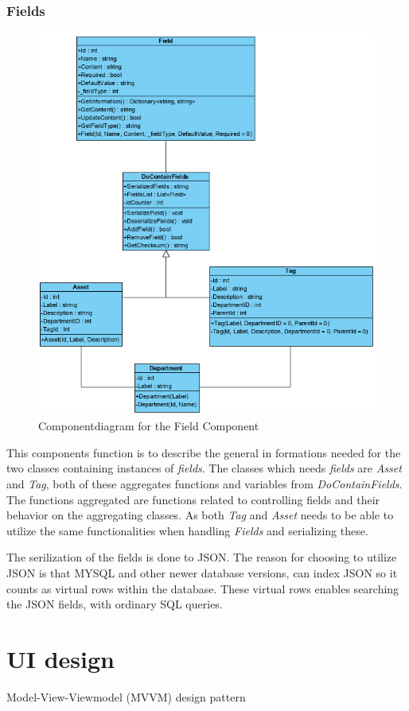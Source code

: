 \subsubsection{Fields}
\begin{figure}[H]
    \centering
    \includegraphics{figures/FieldsComponent.PNG}
    \caption{Componentdiagram for the Field Component}
    \label{fig:FieldsComponent}
\end{figure}
This components function is to describe the general in formations needed for the two classes containing instances of \textit{fields}. The classes which needs \textit{fields} are \textit{Asset} and \textit{Tag}, both of these aggregates functions and variables from \textit{DoContainFields}. The functions aggregated are functions related to controlling fields and their behavior on the aggregating classes. As both \textit{Tag} and \textit{Asset} needs to be able to utilize the same functionalities when handling \textit{Fields} and serializing these. 
\par
The serilization of the fields is done to JSON. The reason for choosing to utilize JSON is that MYSQL and other newer database versions, can index JSON so it counts as virtual rows within the database. These virtual rows enables searching the JSON fields, with ordinary SQL queries.



\section{UI design}
Model-View-Viewmodel (MVVM) design pattern